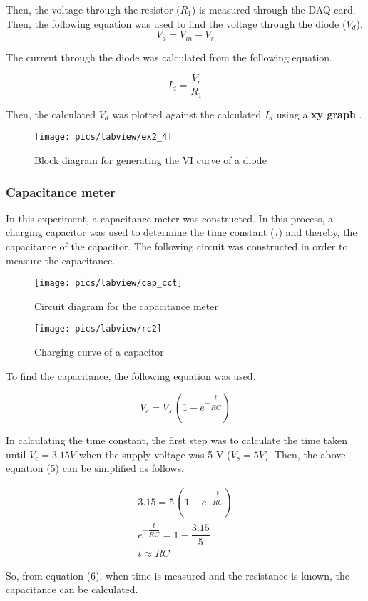 \noindent
Then, the voltage through the resistor ($R _{1} $) is measured through the DAQ card. Then, the following equation was used to find the voltage through the diode ($ V _{d} $).
\begin{equation}
	V _{d} = V _{in}-V _{r}
\end{equation}

\noindent
The current through the diode was calculated from the following equation.

\begin{equation}
I _{d} = \dfrac{V _{r}}{R _{1}}
\end{equation}

\noindent
Then, the calculated $V _{d} $ was plotted against the calculated $ I _{d}  $ using a \textbf{xy graph} .

\begin{figure}[!h]
	\centering
	\texttt{[image: pics/labview/ex2\_4]}
	\caption{Block diagram for generating the VI curve of a diode}
	\label{fig:ex13}
\end{figure}


\subsubsection{Capacitance meter}

In this experiment, a capacitance meter was constructed. In this process, a charging capacitor was used to determine the time constant ($ \tau $) and thereby, the capacitance of the capacitor. The following circuit was constructed in order to measure the capacitance.

\begin{figure}[!h]
	\centering
	\texttt{[image: pics/labview/cap\_cct]}
	\caption{Circuit diagram for the capacitance meter}
	\label{fig:ex14}
\end{figure}

\pagebreak

\begin{figure}[!h]
	\centering
	\texttt{[image: pics/labview/rc2]}
	\caption{Charging curve of a capacitor}
	\label{fig:ex15}
\end{figure}


\noindent
To find the capacitance, the following equation was used.

\begin{equation}
	V_{c}= V_{s}\,  (1-e^{- \dfrac{t}{RC}}) 
\end{equation}

\noindent
In calculating the time constant, the first step was to calculate the time taken until $ V_{c} = 3.15 V $  when the supply voltage was 5 V ($ V_{s} = 5 V $). Then, the above equation (5) can be simplified as follows.


\begin{gather}
  \nonumber 3.15= 5\, (1-e^{- \dfrac{t}{RC}})\\
\nonumber e^{- \dfrac{t}{RC}} = 1 - \dfrac{3.15}{5}  \\
t \approx RC
\end{gather}

\noindent
So, from equation (6), when time is measured and the resistance is known, the capacitance can be calculated.